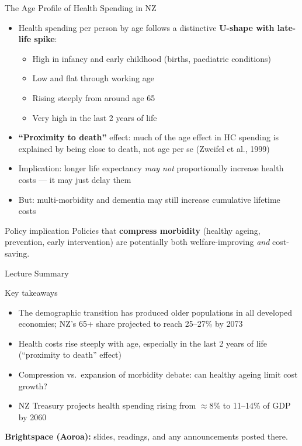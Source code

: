 \documentclass[aspectratio=169, 12pt]{beamer}
\newcommand{\summaryside}[1]{%
  \begin{frame}{Lecture Summary}
    \begin{exampleblock}{Key takeaways}
      \begin{itemize}#1\end{itemize}
    \end{exampleblock}
    \vspace{0.5em}
    {\footnotesize\textcolor{OtagoGold}{\textbf{Brightspace (Aoroa):}} slides, readings, and any announcements posted there.}
  \end{frame}}
\begin{document}
\begin{frame}{The Age Profile of Health Spending in NZ}
  \begin{itemize}
    \item Health spending per person by age follows a distinctive \textbf{U-shape with late-life
          spike}:
    \begin{itemize}
      \item High in infancy and early childhood (births, paediatric conditions)
      \item Low and flat through working age
      \item Rising steeply from around age 65
      \item Very high in the last 2 years of life
    \end{itemize}
    \item \textbf{``Proximity to death''} effect: much of the age effect in HC spending is
          explained by being close to death, not age per se (Zweifel et al., 1999)
    \item Implication: longer life expectancy \emph{may not} proportionally increase health costs
          --- it may just delay them
    \item But: multi-morbidity and dementia may still increase cumulative lifetime costs
  \end{itemize}
  \begin{exampleblock}{Policy implication}
    Policies that \textbf{compress morbidity} (healthy ageing, prevention, early intervention)
    are potentially both welfare-improving \emph{and} cost-saving.
  \end{exampleblock}
\end{frame}

\summaryside{
  \item The demographic transition has produced older populations in all developed economies; NZ's 65+ share projected to reach 25--27\% by 2073
  \item Health costs rise steeply with age, especially in the last 2 years of life (``proximity to death'' effect)
  \item Compression vs.\ expansion of morbidity debate: can healthy ageing limit cost growth?
  \item NZ Treasury projects health spending rising from $\approx$8\% to 11--14\% of GDP by 2060
}

\end{document}
